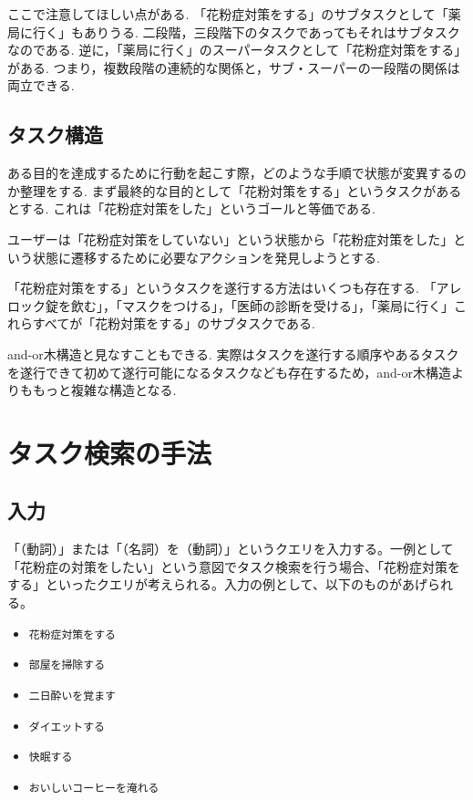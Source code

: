 \documentclass[submit,techreq]{ipsj}
\def\|{\verb|}
\begin{document}
ここで注意してほしい点がある. 「花粉症対策をする」のサブタスクとして「薬局に行く」もありうる. 二段階，三段階下のタスクであってもそれはサブタスクなのである. 逆に，「薬局に行く」のスーパータスクとして「花粉症対策をする」がある. つまり，複数段階の連続的な関係と，サブ・スーパーの一段階の関係は両立できる.


%3.2
\subsection{タスク構造}
ある目的を達成するために行動を起こす際，どのような手順で状態が変異するのか整理をする. まず最終的な目的として「花粉対策をする」というタスクがあるとする. これは「花粉症対策をした」というゴールと等価である.

ユーザーは「花粉症対策をしていない」という状態から「花粉症対策をした」という状態に遷移するために必要なアクションを発見しようとする.

「花粉症対策をする」というタスクを遂行する方法はいくつも存在する. 「アレロック錠を飲む」，「マスクをつける」，「医師の診断を受ける」，「薬局に行く」これらすべてが「花粉対策をする」のサブタスクである.

and-or木構造と見なすこともできる. 実際はタスクを遂行する順序やあるタスクを遂行できて初めて遂行可能になるタスクなども存在するため，and-or木構造よりももっと複雑な構造となる.



%4
\section{タスク検索の手法}

%4.1
\subsection{入力}
「（動詞）」または「（名詞）を（動詞）」というクエリを入力する。一例として「花粉症の対策をしたい」という意図でタスク検索を行う場合、「花粉症対策をする」といったクエリが考えられる。入力の例として、以下のものがあげられる。

\begin{itemize}
\item \|花粉症対策をする|
\item \|部屋を掃除する|
\item \|二日酔いを覚ます|
\item \|ダイエットする|
\item \|快眠する|
\item \|おいしいコーヒーを淹れる|
\end{itemize}
\end{document}
